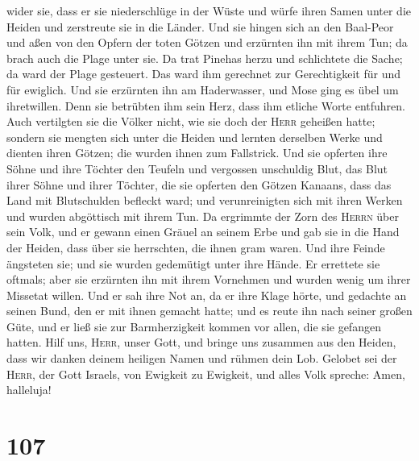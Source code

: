 wider sie, dass er sie niederschlüge in der Wüste  und
würfe ihren Samen unter die Heiden und zerstreute sie in die Länder.
 Und sie hingen sich an den Baal-Peor und aßen von den
Opfern der toten Götzen  und erzürnten ihn mit ihrem Tun;
da brach auch die Plage unter sie.  Da trat Pinehas herzu
und schlichtete die Sache; da ward der Plage gesteuert. 
Das ward ihm gerechnet zur Gerechtigkeit für und für ewiglich.
 Und sie erzürnten ihn am Haderwasser, und Mose ging es
übel um ihretwillen.  Denn sie betrübten ihm sein Herz,
dass ihm etliche Worte entfuhren.  Auch vertilgten sie
die Völker nicht, wie sie doch der \textsc{Herr} geheißen hatte;
 sondern sie mengten sich unter die Heiden und lernten
derselben Werke  und dienten ihren Götzen; die wurden
ihnen zum Fallstrick.  Und sie opferten ihre Söhne und
ihre Töchter den Teufeln  und vergossen unschuldig Blut,
das Blut ihrer Söhne und ihrer Töchter, die sie opferten den Götzen
Kanaans, dass das Land mit Blutschulden befleckt ward; 
und verunreinigten sich mit ihren Werken und wurden abgöttisch mit ihrem
Tun.  Da ergrimmte der Zorn des \textsc{Herrn} über sein
Volk, und er gewann einen Gräuel an seinem Erbe  und gab
sie in die Hand der Heiden, dass über sie herrschten, die ihnen gram
waren.  Und ihre Feinde ängsteten sie; und sie wurden
gedemütigt unter ihre Hände.  Er errettete sie oftmals;
aber sie erzürnten ihn mit ihrem Vornehmen und wurden wenig um ihrer
Missetat willen.  Und er sah ihre Not an, da er ihre
Klage hörte,  und gedachte an seinen Bund, den er mit
ihnen gemacht hatte; und es reute ihn nach seiner großen Güte,
 und er ließ sie zur Barmherzigkeit kommen vor allen, die
sie gefangen hatten.  Hilf uns, \textsc{Herr}, unser
Gott, und bringe uns zusammen aus den Heiden, dass wir danken deinem
heiligen Namen und rühmen dein Lob.  Gelobet sei der
\textsc{Herr}, der Gott Israels, von Ewigkeit zu Ewigkeit, und alles
Volk spreche: Amen, halleluja!

\hypertarget{section-106}{%
\section{107}\label{section-106}}

